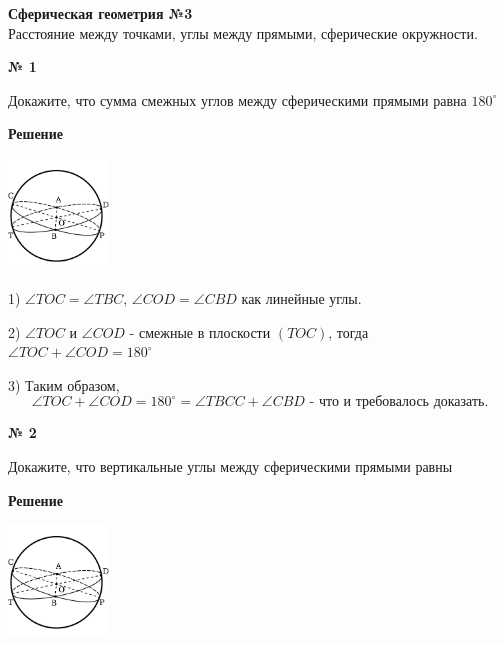 


    \begin{center}
        \textbf{Сферическая геометрия №3}\\
        Расстояние между точками, углы между прямыми, сферические окружности.
    \end{center}

    \begin{center}
        \textbf{№ 1}
    \end{center}

    Докажите, что сумма смежных углов между сферическими прямыми равна $180^\circ$

    \textbf{Решение}\\

    \begin{center}
        \includegraphics[width=0.2\textwidth]{images/img4}\\
    \end{center}

    1) $\angle TOC = \angle TBC$, $\angle COD = \angle CBD$ как линейные углы.

    2) $\angle TOC$ и $\angle COD$ - смежные в плоскости $(TOC)$, тогда $\angle TOC + \angle COD = 180^{\circ}$

    3) Таким образом,
    \[
        \angle TOC + \angle COD = 180^{\circ} = \angle TBCC + \angle CBD \text{ - что и требовалось доказать.}
    \]

    \begin{center}
        \textbf{№ 2}
    \end{center}

    Докажите, что вертикальные углы между сферическими прямыми равны

    \textbf{Решение}\\

    \begin{center}
        \includegraphics[width=0.2\textwidth]{images/img5}\\
    \end{center}

